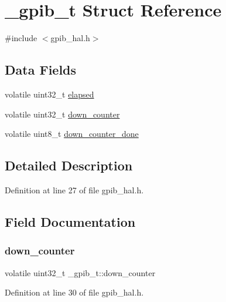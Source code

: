 \hypertarget{struct__gpib__t}{}\section{\+\_\+gpib\+\_\+t Struct Reference}
\label{struct__gpib__t}


{\ttfamily \#include $<$gpib\+\_\+hal.\+h$>$}

\subsection*{Data Fields}
\begin{DoxyCompactItemize}
\item 
volatile uint32\+\_\+t \hyperlink{struct__gpib__t_a99a38aef880eb075f625f33d7bac31dd}{elapsed}
\item 
volatile uint32\+\_\+t \hyperlink{struct__gpib__t_a21ed3be06f76b0a5237b5e64bc2e8793}{down\+\_\+counter}
\item 
volatile uint8\+\_\+t \hyperlink{struct__gpib__t_af2622dd8668ecb24c42a2da2d8956538}{down\+\_\+counter\+\_\+done}
\end{DoxyCompactItemize}


\subsection{Detailed Description}


Definition at line 27 of file gpib\+\_\+hal.\+h.



\subsection{Field Documentation}
\mbox{\label{struct__gpib__t_a21ed3be06f76b0a5237b5e64bc2e8793}} 
\subsubsection{\texorpdfstring{down\+\_\+counter}{down\_counter}}
{\footnotesize\ttfamily volatile uint32\+\_\+t \+\_\+gpib\+\_\+t\+::down\+\_\+counter}



Definition at line 30 of file gpib\+\_\+hal.\+h.



